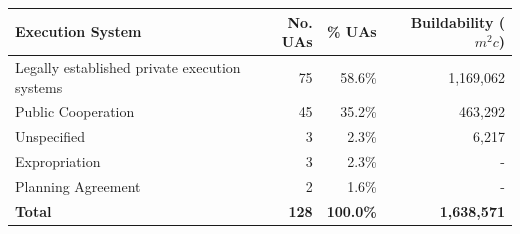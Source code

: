 \begin{tabular}{lrrr}
  \toprule
  \textbf{Execution System} & \textbf{No. UAs} & \textbf{\% UAs} & \textbf{Buildability ($m^2c$)} \\
  \midrule
  Legally established private execution systems & 75 & 58.6\% & 1,169,062 \\
  Public Cooperation & 45 & 35.2\% & 463,292 \\
  Unspecified & 3 & 2.3\% & 6,217 \\
  Expropriation & 3 & 2.3\% & - \\
  Planning Agreement & 2 & 1.6\% & - \\
  \midrule
  \textbf{Total} & \textbf{128} & \textbf{100.0\%} & \textbf{1,638,571} \\
  \bottomrule
\end{tabular}
